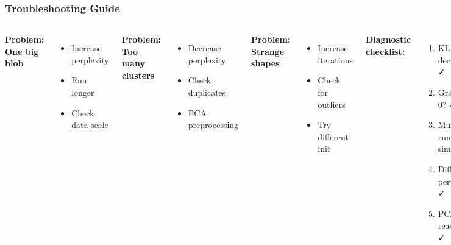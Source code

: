 \documentclass[aspectratio=169]{beamer}
\begin{document}
\begin{frame}
\frametitle{Troubleshooting Guide}
\begin{columns}[T]
\textbf{Problem: One big blob}
\begin{itemize}
\small
\item Increase perplexity
\item Run longer
\item Check data scale
\end{itemize}

\textbf{Problem: Too many clusters}
\begin{itemize}
\small
\item Decrease perplexity  
\item Check duplicates
\item PCA preprocessing
\end{itemize}

\textbf{Problem: Strange shapes}
\begin{itemize}
\small
\item Increase iterations
\item Check for outliers
\item Try different init
\end{itemize}

\textbf{Diagnostic checklist:}
\begin{enumerate}
\small
\item KL decreasing? ✓
\item Gradient → 0? ✓
\item Multiple runs similar? ✓
\item Different perplexities? ✓
\item PCA looks reasonable? ✓
\end{enumerate}

\vspace{0.3cm}
\textbf{Emergency fixes:}
\begin{itemize}
\small
\item Subsample to debug
\item Remove outliers
\item Try UMAP instead
\end{itemize}
\end{columns}
\end{frame}
\end{document}
